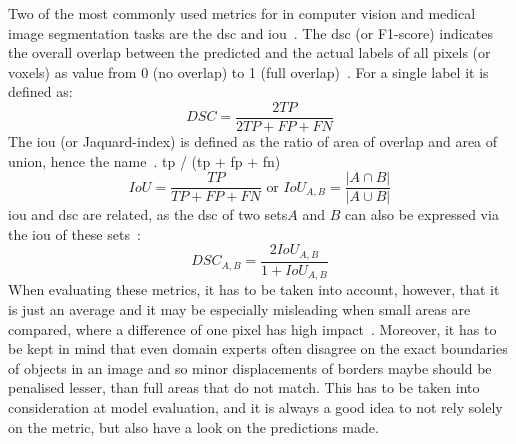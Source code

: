 Two of the most commonly used metrics for in computer vision and medical image segmentation tasks are the \gls{dsc} and \gls{iou}~\autocite{Reinke2022}.
The \gls{dsc} (or F1-score) indicates the overall overlap between the predicted and the actual labels of all pixels (or voxels) as value from 0 (no overlap) to 1 (full overlap)~\autocite{Reinke2022}.
For a single label it is defined as:
\begin{equation} 
    DSC = \frac{2TP}{2TP + FP + FN}
    \label{eq:dsc}
\end{equation}
The \gls{iou} (or Jaquard-index) is defined as the ratio of area of overlap and area of union, hence the name~\autocite{Reinke2022}.
tp / (tp + fp + fn)
\begin{equation}
    IoU = \frac{TP}{TP + FP + FN} \text{ or } IoU_{A,B} = \frac{|A \cap B|}{|A \cup B|}
    \label{eq:IoU}
\end{equation}
\gls{iou} and \gls{dsc} are related, as the \gls{dsc} of two sets$A$ and $B$ can also be expressed via the \gls{iou} of these sets~\autocite{Reinke2022}:
\begin{equation}
    DSC_{A,B} = \frac{2IoU_{A,B}}{1 + IoU_{A,B}}
    \label{eq:dsc-IoU}
\end{equation}
When evaluating these metrics, it has to be taken into account, however, that it is just an average and it may be especially misleading when small areas are compared, where a difference of one pixel has high impact~\autocite{Reinke2022}.
Moreover, it has to be kept in mind that even domain experts often disagree on the exact boundaries of objects in an image and so minor displacements of borders maybe should be penalised lesser, than full areas that do not match.
This has to be taken into consideration at model evaluation, and it is always a good idea to not rely solely on the metric, but also have a look on the predictions made.


